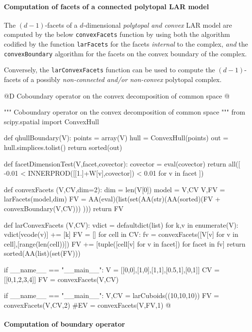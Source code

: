 \documentclass[11pt,oneside]{article}	%
\begin{document}
\paragraph{Computation of facets of a connected polytopal LAR model}

The $(d-1)$-facets of a $d$-dimensional \emph{polytopal and convex} LAR model are computed by the below \texttt{convexFacets} function by using both the algorithm codified by the function \texttt{larFacets} for the facets \emph{internal} to the complex, \emph{and} the \texttt{convexBoundary} algorithm for the facets on the convex boundary of the complex.

Conversely, the \texttt{larConvexFacets} function can be used to compute the $(d-1)$-facets of a possibly \emph{non-connected and/or non-convex} polytopal complex.

@D Coboundary operator on the convex decomposition of common space
@{""" Coboundary operator on the convex decomposition of common space """
from scipy.spatial import ConvexHull

def qhullBoundary(V):
	points = array(V)
	hull = ConvexHull(points)
	out = hull.simplices.tolist()
	return sorted(out)

def facetDimensionTest(V,facet,covector):
	covector = eval(covector)
	return all([ -0.01 < INNERPROD([[1.]+W[v],covector]) < 0.01 for v in facet ])

def convexFacets (V,CV,dim=2):
	dim = len(V[0])
	model = V,CV
	V,FV = larFacets(model,dim)	
	FV = AA(eval)(list(set(AA(str)(AA(sorted)(FV + convexBoundary(V,CV))) )))
	return FV

def larConvexFacets (V,CV):
	vdict = defaultdict(list)
	for k,v in enumerate(V): vdict[vcode(v)] += [k]
	FV = []
	for cell in CV: 
		fv = convexFacets([V[v] for v in cell],[range(len(cell))])
		FV += [tuple([cell[v] for v in facet]) for facet in fv]
	return sorted(AA(list)(set(FV)))
	
if __name__ == "__main__":
	V = [[0,0],[1,0],[1,1],[0.5,1],[0,1]]
	CV = [[0,1,2,3,4]]
	FV = convexFacets(V,CV)
	
if __name__ == "__main__":
	V,CV = larCuboids((10,10,10))
	FV = convexFacets(V,CV,2)
	#EV = convexFacets(V,FV,1)
@}


\paragraph{Computation of boundary operator}
\end{document}
